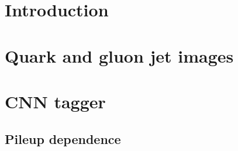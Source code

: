 \documentclass[UKenglish,texlive=2016,PUB,coverpage]{\ATLASLATEXPATH atlasdoc}
\begin{document}
\maketitle

\tableofcontents

\clearpage

\section{Introduction}
\label{sec:intro}




% 


\section{Quark and gluon jet images}
\label{sec:images}



\section{CNN tagger}
\label{sec:tagger}



\subsection{Pileup dependence}
\label{sec:pileup}
\end{document}
